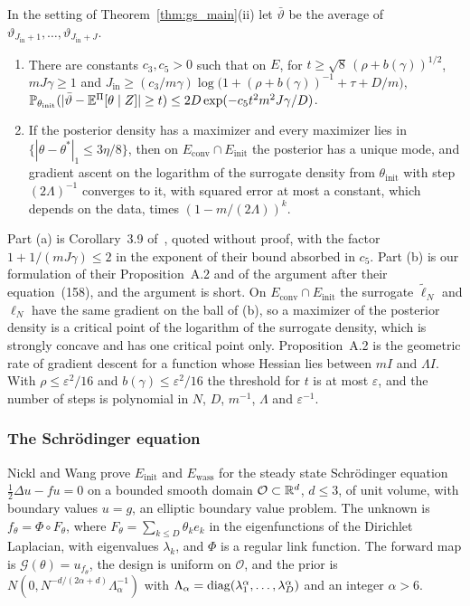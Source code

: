 \begin{corollary}\label{cor:gs_mean}
In the setting of Theorem~\ref{thm:gs_main}(ii) let $\bar\vartheta$ be the average of $\vartheta_{J_{\mathrm{in}}+1},\dots,\vartheta_{J_{\mathrm{in}}+J}$.
\begin{enumerate}[label=(\alph*),nosep]
\item There are constants $c_3,c_5>0$ such that on $E$, for $t\ge\sqrt8\,(\rho+b(\gamma))^{1/2}$, $mJ\gamma\ge1$ and $J_{\mathrm{in}}\ge(c_3/m\gamma)\log\big(1+(\rho+b(\gamma))^{-1}+\tau+D/m\big)$, $\mathbb{P}_{\theta_{\mathrm{init}}}(|\bar\vartheta-\mathbb{E}^\Pi[\theta\mid Z]|\ge t)\le2D\exp(-c_5t^2m^2J\gamma/D)$.
\item If the posterior density has a maximizer and every maximizer lies in $\{|\theta-\theta^*|_1\le3\eta/8\}$, then on $E_{\mathrm{conv}}\cap E_{\mathrm{init}}$ the posterior has a unique mode, and gradient ascent on the logarithm of the surrogate density from $\theta_{\mathrm{init}}$ with step $(2\Lambda)^{-1}$ converges to it, with squared error at most a constant, which depends on the data, times $(1-m/(2\Lambda))^k$.
\end{enumerate}
\end{corollary}

Part (a) is Corollary~3.9 of~\cite{nicklwang2024}, quoted without proof, with the factor $1+1/(mJ\gamma)\le2$ in the exponent of their bound absorbed in $c_5$. Part (b) is our formulation of their Proposition~A.2 and of the argument after their equation~(158), and the argument is short. On $E_{\mathrm{conv}}\cap E_{\mathrm{init}}$ the surrogate $\tilde\ell_N$ and $\ell_N$ have the same gradient on the ball of (b), so a maximizer of the posterior density is a critical point of the logarithm of the surrogate density, which is strongly concave and has one critical point only. Proposition~A.2 is the geometric rate of gradient descent for a function whose Hessian lies between $mI$ and $\Lambda I$. With $\rho\le\varepsilon^2/16$ and $b(\gamma)\le\varepsilon^2/16$ the threshold for $t$ is at most $\varepsilon$, and the number of steps is polynomial in $N$, $D$, $m^{-1}$, $\Lambda$ and $\varepsilon^{-1}$.

\subsubsection{The Schr\"odinger equation} Nickl and Wang prove $E_{\mathrm{init}}$ and $E_{\mathrm{wass}}$ for the steady state Schr\"odinger equation $\frac12\Delta u-fu=0$ on a bounded smooth domain $\mathcal{O}\subset\mathbb{R}^d$, $d\le3$, of unit volume, with boundary values $u=g$, an elliptic boundary value problem. The unknown is $f_\theta=\Phi\circ F_\theta$, where $F_\theta=\sum_{k\le D}\theta_ke_k$ in the eigenfunctions of the Dirichlet Laplacian, with eigenvalues $\lambda_k$, and $\Phi$ is a regular link function. The forward map is $\mathcal{G}(\theta)=u_{f_\theta}$, the design is uniform on $\mathcal{O}$, and the prior is $N(0,N^{-d/(2\alpha+d)}\Lambda_\alpha^{-1})$ with $\Lambda_\alpha=\operatorname{diag}(\lambda_1^\alpha,\dots,\lambda_D^\alpha)$ and an integer $\alpha>6$.

